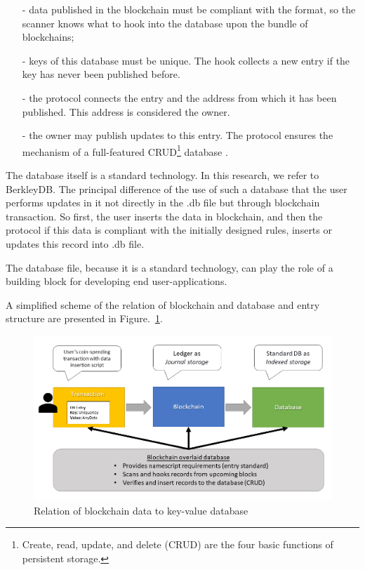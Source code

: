\begin{multicols}{2}
\begin{itemize}
\item [-]data published in the blockchain must be compliant with the format, so the scanner knows what to hook into the database upon the bundle of blockchains;
\item [-] keys of this database must be unique. The hook collects a new entry if the key has never been published before.
\item [-] the protocol connects the entry and the address from which it has been published. This address is considered the owner.
\item [-] the owner may publish updates to this entry. The protocol ensures the mechanism of a full-featured CRUD\footnote{Create, read, update, and delete (CRUD) are the four basic functions of persistent storage.} database \cite{art1-key27}.
\end{itemize}

The database itself is a standard technology. In this research, we refer to BerkleyDB. The principal difference of the use of such a database that the user performs updates in it not directly in the .db file but through blockchain transaction. So first, the user inserts the data in blockchain, and then the protocol if this data is compliant with the initially designed rules, inserts or updates this record into .db file.

The database file, because it is a standard technology, can play the role of a building block for developing end user-applications.

A simplified scheme of the relation of blockchain and database and entry structure are presented in Figure.~\ref{chap1-fig02}.

\begin{figure}[H]
\centering
\includegraphics[scale=1.06]{src/Figures/chap1/chap1-fig02.jpg}
\caption{Relation of blockchain data to key-value database}\label{chap1-fig02}
\end{figure}


\end{multicols}
